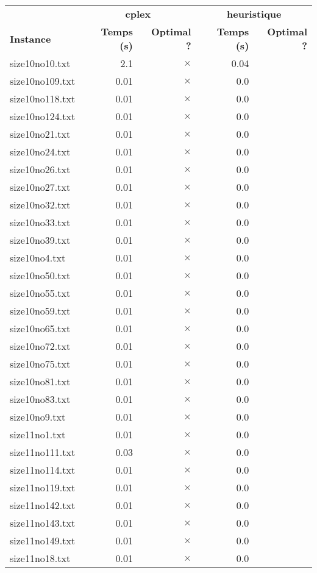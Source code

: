 \documentclass{article}
\begin{document}
\begin{center}
\renewcommand{\arraystretch}{1.4} 
 \begin{tabular}{lrrrr}
	\hline
 & \multicolumn{2}{c}{\textbf{cplex}} & \multicolumn{2}{c}{\textbf{heuristique}}\\
\textbf{Instance}  & \textbf{Temps (s)} & \textbf{Optimal ?}  & \textbf{Temps (s)} & \textbf{Optimal ?} \\\hline

size10no10.txt & 2.1 & 
$\times$
 & 0.04 & 
\\
size10no109.txt & 0.01 & 
$\times$
 & 0.0 & 
\\
size10no118.txt & 0.01 & 
$\times$
 & 0.0 & 
\\
size10no124.txt & 0.01 & 
$\times$
 & 0.0 & 
\\
size10no21.txt & 0.01 & 
$\times$
 & 0.0 & 
\\
size10no24.txt & 0.01 & 
$\times$
 & 0.0 & 
\\
size10no26.txt & 0.01 & 
$\times$
 & 0.0 & 
\\
size10no27.txt & 0.01 & 
$\times$
 & 0.0 & 
\\
size10no32.txt & 0.01 & 
$\times$
 & 0.0 & 
\\
size10no33.txt & 0.01 & 
$\times$
 & 0.0 & 
\\
size10no39.txt & 0.01 & 
$\times$
 & 0.0 & 
\\
size10no4.txt & 0.01 & 
$\times$
 & 0.0 & 
\\
size10no50.txt & 0.01 & 
$\times$
 & 0.0 & 
\\
size10no55.txt & 0.01 & 
$\times$
 & 0.0 & 
\\
size10no59.txt & 0.01 & 
$\times$
 & 0.0 & 
\\
size10no65.txt & 0.01 & 
$\times$
 & 0.0 & 
\\
size10no72.txt & 0.01 & 
$\times$
 & 0.0 & 
\\
size10no75.txt & 0.01 & 
$\times$
 & 0.0 & 
\\
size10no81.txt & 0.01 & 
$\times$
 & 0.0 & 
\\
size10no83.txt & 0.01 & 
$\times$
 & 0.0 & 
\\
size10no9.txt & 0.01 & 
$\times$
 & 0.0 & 
\\
size11no1.txt & 0.01 & 
$\times$
 & 0.0 & 
\\
size11no111.txt & 0.03 & 
$\times$
 & 0.0 & 
\\
size11no114.txt & 0.01 & 
$\times$
 & 0.0 & 
\\
size11no119.txt & 0.01 & 
$\times$
 & 0.0 & 
\\
size11no142.txt & 0.01 & 
$\times$
 & 0.0 & 
\\
size11no143.txt & 0.01 & 
$\times$
 & 0.0 & 
\\
size11no149.txt & 0.01 & 
$\times$
 & 0.0 & 
\\
size11no18.txt & 0.01 & 
$\times$
 & 0.0 & 
\\
\hline\end{tabular}
\end{center}
\end{document}
